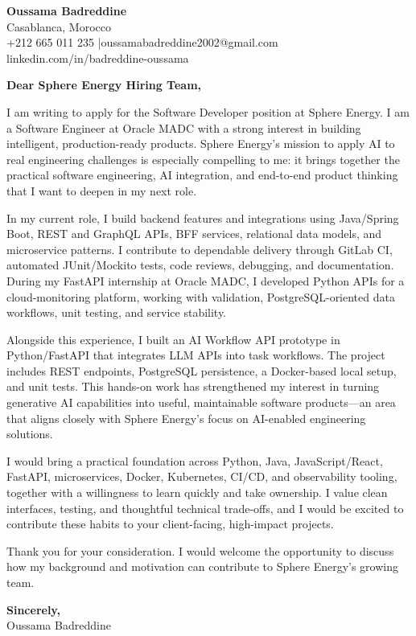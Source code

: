 \documentclass[11pt]{article}
\begin{document}
\begin{flushright}
\textbf{Oussama Badreddine} \\
Casablanca, Morocco \\
+212 665 011 235 \quad|\quad oussamabadreddine2002@gmail.com \\
linkedin.com/in/badreddine-oussama
\end{flushright}

\vspace{0.35cm}

\textbf{Dear Sphere Energy Hiring Team,}

I am writing to apply for the Software Developer position at Sphere Energy. I am a Software Engineer at Oracle MADC with a strong interest in building intelligent, production-ready products. Sphere Energy's mission to apply AI to real engineering challenges is especially compelling to me: it brings together the practical software engineering, AI integration, and end-to-end product thinking that I want to deepen in my next role.

In my current role, I build backend features and integrations using Java/Spring Boot, REST and GraphQL APIs, BFF services, relational data models, and microservice patterns. I contribute to dependable delivery through GitLab CI, automated JUnit/Mockito tests, code reviews, debugging, and documentation. During my FastAPI internship at Oracle MADC, I developed Python APIs for a cloud-monitoring platform, working with validation, PostgreSQL-oriented data workflows, unit testing, and service stability.

Alongside this experience, I built an AI Workflow API prototype in Python/FastAPI that integrates LLM APIs into task workflows. The project includes REST endpoints, PostgreSQL persistence, a Docker-based local setup, and unit tests. This hands-on work has strengthened my interest in turning generative AI capabilities into useful, maintainable software products---an area that aligns closely with Sphere Energy's focus on AI-enabled engineering solutions.

I would bring a practical foundation across Python, Java, JavaScript/React, FastAPI, microservices, Docker, Kubernetes, CI/CD, and observability tooling, together with a willingness to learn quickly and take ownership. I value clean interfaces, testing, and thoughtful technical trade-offs, and I would be excited to contribute these habits to your client-facing, high-impact projects.

Thank you for your consideration. I would welcome the opportunity to discuss how my background and motivation can contribute to Sphere Energy's growing team.

\vspace{0.25cm}
\textbf{Sincerely,} \\
Oussama Badreddine
\end{document}
